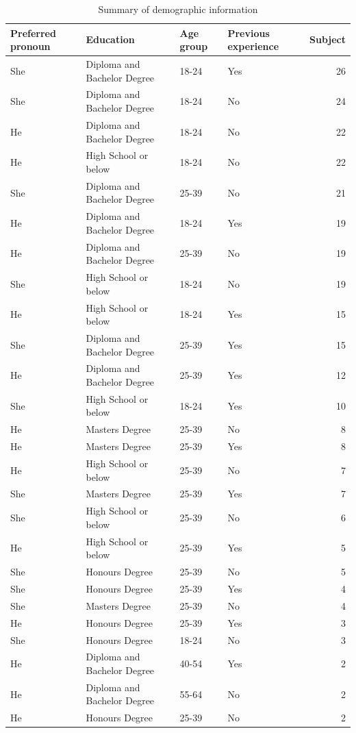 \documentclass[]{interact}
\theoremstyle{plain}%
\theoremstyle{definition}
\theoremstyle{remark}
\begin{document}
\begin{table}

\caption{\label{tab:demographic-table}Summary of demographic information}
\centering
\begin{tabular}[t]{llllr}
\toprule
Preferred pronoun & Education & Age group & Previous experience & Subject\\
\midrule
She & Diploma and Bachelor Degree & 18-24 & Yes & 26\\
She & Diploma and Bachelor Degree & 18-24 & No & 24\\
He & Diploma and Bachelor Degree & 18-24 & No & 22\\
He & High School or below & 18-24 & No & 22\\
She & Diploma and Bachelor Degree & 25-39 & No & 21\\
He & Diploma and Bachelor Degree & 18-24 & Yes & 19\\
He & Diploma and Bachelor Degree & 25-39 & No & 19\\
She & High School or below & 18-24 & No & 19\\
He & High School or below & 18-24 & Yes & 15\\
She & Diploma and Bachelor Degree & 25-39 & Yes & 15\\
He & Diploma and Bachelor Degree & 25-39 & Yes & 12\\
She & High School or below & 18-24 & Yes & 10\\
He & Masters Degree & 25-39 & No & 8\\
He & Masters Degree & 25-39 & Yes & 8\\
He & High School or below & 25-39 & No & 7\\
She & Masters Degree & 25-39 & Yes & 7\\
She & High School or below & 25-39 & No & 6\\
He & High School or below & 25-39 & Yes & 5\\
She & Honours Degree & 25-39 & No & 5\\
She & Honours Degree & 25-39 & Yes & 4\\
She & Masters Degree & 25-39 & No & 4\\
He & Honours Degree & 25-39 & Yes & 3\\
She & Honours Degree & 18-24 & No & 3\\
He & Diploma and Bachelor Degree & 40-54 & Yes & 2\\
He & Diploma and Bachelor Degree & 55-64 & No & 2\\
He & Honours Degree & 25-39 & No & 2\\

\end{tabular}
\end{table}
\end{document}
